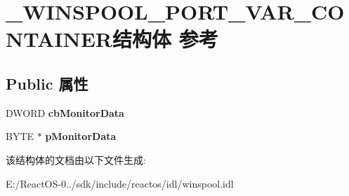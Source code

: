 \hypertarget{struct___w_i_n_s_p_o_o_l___p_o_r_t___v_a_r___c_o_n_t_a_i_n_e_r}{}\section{\+\_\+\+W\+I\+N\+S\+P\+O\+O\+L\+\_\+\+P\+O\+R\+T\+\_\+\+V\+A\+R\+\_\+\+C\+O\+N\+T\+A\+I\+N\+E\+R结构体 参考}
\label{struct___w_i_n_s_p_o_o_l___p_o_r_t___v_a_r___c_o_n_t_a_i_n_e_r}
\subsection*{Public 属性}
\begin{DoxyCompactItemize}
\item 
\mbox{\label{struct___w_i_n_s_p_o_o_l___p_o_r_t___v_a_r___c_o_n_t_a_i_n_e_r_a0f634b72e4df03e3d3c83fca731c4130}} 
D\+W\+O\+RD {\bfseries cb\+Monitor\+Data}
\item 
\mbox{\label{struct___w_i_n_s_p_o_o_l___p_o_r_t___v_a_r___c_o_n_t_a_i_n_e_r_adb02438d7d52d0d01b197188b8c8fdc9}} 
B\+Y\+TE $\ast$ {\bfseries p\+Monitor\+Data}
\end{DoxyCompactItemize}


该结构体的文档由以下文件生成\+:\begin{DoxyCompactItemize}
\item 
E\+:/\+React\+O\+S-\/0../sdk/include/reactos/idl/winspool.\+idl\end{DoxyCompactItemize}
